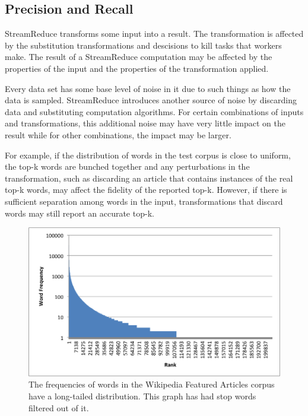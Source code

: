 \documentclass[12pt,twocolumn]{article}
\begin{document}
\subsection{Precision and Recall}
StreamReduce transforms some input into a result. The transformation is affected by
the substitution transformations and descisions to kill tasks that workers make.
The result of a StreamReduce computation may be affected by the properties of the input
and the properties of the transformation applied.

Every data set has some base level of noise in it due to such things as how the data is
sampled. StreamReduce introduces another source of noise by discarding data and
substituting computation algorithms. For certain combinations of inputs and transformations,
this additional noise may have very little impact on the result
while for other combinations, the impact may be larger.

For example, if the distribution of words in the test corpus is close to uniform, the top-k
words are bunched together and any perturbations in the transformation,
such as discarding an
article that contains instances of the real top-k words, may affect the fidelity of the
reported top-k. However, if there is sufficient separation among words in the input,
transformations that discard words may still report an accurate top-k.





\begin{figure}
\includegraphics[width=\linewidth]{long-tail-ranks.png}
\caption{The frequencies of words in the Wikipedia Featured Articles corpus have a
long-tailed distribution. This graph has had stop words~\cite{stopwords} filtered out of it.}
\label{fig:wordDist}
\end{figure}
\end{document}
